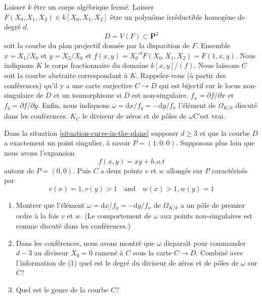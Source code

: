 \begin{situation}
\label{situation-curve-in-the-plane}
Laisser $k$ être un corps algébrique fermé.
Laisser $F(X_0, X_1, X_2) \in k[X_0, X_1, X_2]$ être un polynôme
irréductible homogène de degré $d$.
$$
D = V(F) \subset \mathbf{P}^2
$$
soit la courbe du plan projectif donnée par la disparition de
$F$. Ensemble $x = X_1/X_0$ et $y
= X_2/X_0$ et $f(x, y) = X_0^{-d}F(X_0, X_1, X_2)
= F(1, x, y)$. Nous indiquons $K$ le corps fractionnaire du
domaine $k[x, y]/(f)$. Nous laissons $C$ soit la courbe
abstraite correspondant à $K$. Rappelez-vous (à partir des conférences) qu'il y a
une carte surjective $C \to D$ qui est bijectif sur le
locus non-singulaire de $D$ et un
isomorphisme si $D$ est non-singulaire. $f_x = \partial f/\partial x$ et $f_y
= \partial f/\partial y$. Enfin, nous indiquons $\omega = \text{d}x/f_y = -
\text{d}y/f_x$ l'élément de $\Omega_{K/k}$ discuté dans les conférences. $K_C$
le diviseur de zéros et de pôles de $\omega$C'est vrai.
\end{situation}

\begin{exercise}
\label{exercise-node-in-the-plane}
Dans la situation \ref{situation-curve-in-the-plane} supposer $d \geq 3$ et que
la courbe $D$ a exactement un point singulier, à savoir $P =
(1 : 0 : 0)$. Supposons plus loin que nous avons l'expansion
$$
f(x, y) = xy + h.o.t
$$
autour de $P = (0, 0)$. Puis $C$ a deux points $v$ et $w$ allongés
sur $P$ caractérisés par
$$
v(x) = 1, v(y) > 1
\quad\text{and}\quad
w(x) > 1, w(y) = 1
$$
\begin{enumerate}
\item Montrer que l'élément $\omega
= \text{d}x/f_y = - \text{d}y/f_x$ de $\Omega_{K/k}$ a un pôle
de premier ordre à la fois $v$ et $w$. (Le comportement
de $\omega$ aux points non-singulaires est comme discuté dans les conférences.)
\item Dans les conférences, nous avons montré que $\omega$ disparaît pour commander $d
- 3$ au diviseur $X_0 = 0$ ramené à $C$ sous la carte
$C \to D$. Combiné avec l'information de (1) quel est le degré du
diviseur de zéros et de pôles de $\omega$ sur $C$?
\item Quel est le genre de la courbe $C$?
\end{enumerate}
\end{exercise}

